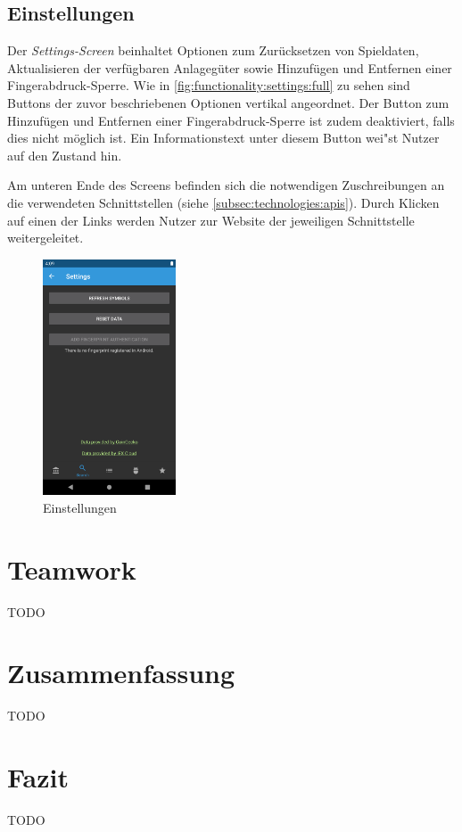 \documentclass[a4paper]{article}
\begin{document}
\subsection{Einstellungen}
\label{subsec:functionality:settings}
Der \textit{Settings-Screen} beinhaltet Optionen zum Zurücksetzen von Spieldaten, Aktualisieren der verfügbaren Anlagegüter sowie Hinzufügen und Entfernen einer Fingerabdruck-Sperre.
Wie in \autoref{fig:functionality:settings:full} zu sehen sind Buttons der zuvor beschriebenen Optionen vertikal angeordnet.
Der Button zum Hinzufügen und Entfernen einer Fingerabdruck-Sperre ist zudem deaktiviert, falls dies nicht möglich ist.
Ein Informationstext unter diesem Button wei"st Nutzer auf den Zustand hin.

Am unteren Ende des Screens befinden sich die notwendigen Zuschreibungen an die verwendeten Schnittstellen (siehe \autoref{subsec:technologies:apis}).
Durch Klicken auf einen der Links werden Nutzer zur Website der jeweiligen Schnittstelle weitergeleitet.

\begin{figure}[H]
	\centering
	\includegraphics[height=7cm,keepaspectratio]{./images/settings.png}
	\caption{Einstellungen}
	\label{fig:functionality:settings:full}
\end{figure}


\section{Teamwork}
\label{sec:teamwork}
TODO


\section{Zusammenfassung}
\label{sec:summary}
TODO


\section{Fazit}
\label{sec:conclusion}
TODO
\end{document}
